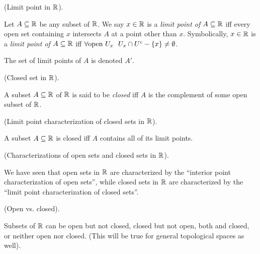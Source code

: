 \begin{defn}
    (Limit point in $\mathbb{R}$).
    
    Let $A \subseteq \mathbb{R}$ be any subset of $\mathbb{R}$. We say $x \in \mathbb{R}$ is a \textit{limit point of $A \subseteq \mathbb{R}$} iff every open set containing $x$ intersects $A$ at a point other than $x$. Symbolically, $x \in \mathbb{R}$ is a \textit{limit point of $A \subseteq \mathbb{R}$} iff  ${\forall \text{open } U_x \text{ } \text{ } U_x \cap U^c - \{x\} \neq \emptyset}$.
    
    The set of limit points of $A$ is denoted $A'$.
\end{defn}

\begin{defn}
    (Closed set in $\mathbb{R}$).
    
    A subset $A \subseteq \mathbb{R}$ of $\mathbb{R}$ is said to be \textit{closed} iff $A$ is the complement of some open subset of $\mathbb{R}$.
\end{defn}

\begin{theorem}
    (Limit point characterization of closed sets in $\mathbb{R}$).
    
    A subset $A \subseteq \mathbb{R}$ is closed iff $A$ contains all of its limit points.
\end{theorem}

\begin{remark}
     (Characterizations of open sets and closed sets in $\mathbb{R}$).
     
     We have seen that open sets in $\mathbb{R}$ are characterized by the ``interior point characterization of open sets'', while closed sets in $\mathbb{R}$ are characterized by the ``limit point characterization of closed sets''.
\end{remark}

\begin{remark}
     (Open vs. closed).
     
     Subsets of $\mathbb{R}$ can be open but not closed, closed but not open, both and closed, or neither open nor closed. (This will be true for general topological spaces as well).
\end{remark}

     

